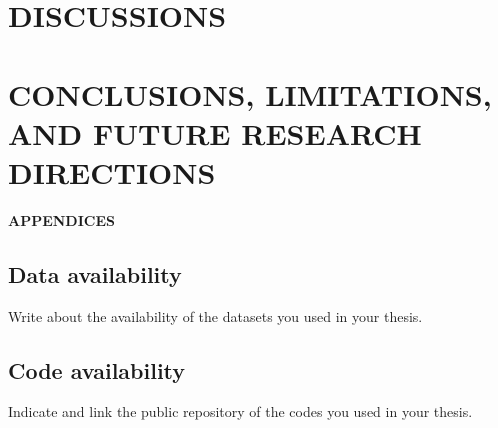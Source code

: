\documentclass[a4paper,12pt,oneside]{book}
\newcommand{\HeadingR}[1]{%
{\large			%
\bfseries{#1}}}
\begin{document}
\chapter{DISCUSSIONS} \label{chap:disc}
\label{sec:discussion}



\chapter{CONCLUSIONS, LIMITATIONS, AND FUTURE RESEARCH DIRECTIONS}\label{chap:concl}
\label{sec:conclusion}



\backmatter
%
\renewcommand\bibname{REFERENCES}
\newpage
{} \label{refs}

\printbibliography[title={REFERENCES}, notsubtype=this thesis]



\appendix
\newpage
\begin{center}
\HeadingR{\MakeUppercase{Appendices}}
\end{center}
{}
%
\section*{Data availability}
Write about the availability of the datasets you used in your thesis.


\section*{Code availability}
Indicate and link the public repository of the codes you used in your thesis.


\end{document}
